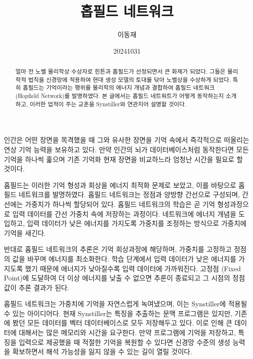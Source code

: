 \documentclass[11pt, oneside]{article}   	%
\title{홉필드 네트워크}
\author{이동재}
\date{20241031}
\begin{document}
\maketitle


\begin{abstract}
  얼마 전 노벨 물리학상 수상자로 힌튼과 홉필드가 선정되면서 큰 화제가 되었다. 그들은 물리학적 법칙을 신경망에 적용하여 현대 생성 모델의 토대를 닦아 노벨상을 수상하게 되었다. 특히 홉필드는 기억이라는 행위를 물리학의 에너지 개념과 결합하여 홉필드 네트워크 (Hopfield Network)를 발명하였다. 본 글에서는 홉필드 네트워트가 어떻게 동작하는지 소개하고, 이러한 업적이 주는 교훈을 Synstiller와 연관지어 설명할 것이다.
\end{abstract}
  인간은 어떤 장면을 목격했을 때 그와 유사한 장면을 기억 속에서 즉각적으로 떠올리는 연상 기억 능력을 보유하고 있다. 만약 인간의 뇌가 데이터베이스처럼 동작한다면 모든 기억을 하나씩 훑으며 기존 기억화 현재 장면을 비교하느라 엄청난 시간을 필요로 할 것이다.
  
  홉필드는 이러한 기억 형성과 회상을 에너지 최적화 문제로 보았고, 이를 바탕으로 홉필드 네트워크를 발명하였다. 홉필드 네트워크는 정점과 양방향 간선으로 구성되며, 간선에는 가중치가 하나씩 할당되어 있다. 홉필드 네트워크의 학습은 곧 기억 형성과정으로 입력 데이터를 간선 가중치 속에 저장하는 과정이다. 네트워크에 에너지 개념을 도입하고, 입력 데이터가 낮은 에너지를 가지도록 가중치를 조정하는 방식으로 가중치에 기억을 새긴다.
  
  반대로 홉필드 네트워크의 추론은 기억 회상과정에 해당하며, 가중치를 고정하고 정점의 값을 바꾸며 에너지를 최소화한다. 학습 단계에서 입력 데이터가 낮은 에너지를 가지도록 했기 때문에 에너지가 낮아질수록 입력 데이터에 가까워진다. 고정점 (Fixed Point)에 도달하여 더 이상 에너지를 낮출 수 없으면 추론이 종료되고 그 시점의 정점 값이 추론 결과가 된다.

  홉필드 네트워크는 가중치에 기억을 자연스럽게 녹여냈으며, 이는 Synstiller에 적용될 수 있는 아이디어다. 현재 Synstiller는 특징을 추출하는 문맥 프로그램은 있지만, 기존에 봤던 모든 데이터를 벡터 데이터베이스로 모두 저장해두고 있다. 이로 인해 큰 데이터에 대해서는 많은 메모리와 시간을 요구한다. 만약 프로그램에 기억을 저장하고, 특징을 입력으로 제공했을 때 적절한 기억을 복원할 수 있다면 신경망 수준의 생성 능력을 확보하면서 해석 가능성을 잃지 않을 수 있는 길이 열릴 것이다. 
\end{document}
